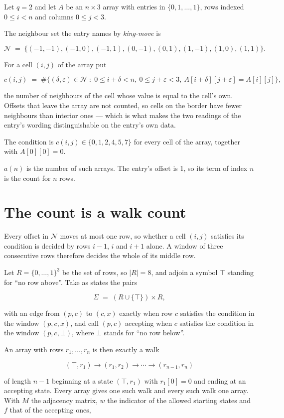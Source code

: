 \documentclass[11pt]{article}
\theoremstyle{definition}
\begin{document}
Let $q = 2$ and let $A$ be an $n \times 3$ array with entries in $\{0,1,\dots,1\}$, rows indexed $0 \le i < n$ and columns $0 \le j < 3$.

The neighbour set the entry names by {\itshape king-move} is

\[\mathcal{N} \;=\; \{(-1,-1), (-1,0), (-1,1), (0,-1), (0,1), (1,-1), (1,0), (1,1)\}.\]

For a cell $(i,j)$ of the array put

\[c(i,j) \;=\; \#\bigl\{(\delta,\varepsilon)\in\mathcal{N} \;:\; 0\le i+\delta<n,\ 0\le j+\varepsilon<3,\ A[i+\delta][j+\varepsilon] = A[i][j]\bigr\},\]

the number of neighbours of the cell whose value is equal to the cell's own. Offsets that leave the array are not counted, so cells on the border have fewer neighbours than interior ones --- which is what makes the two readings of the entry's wording distinguishable on the entry's own data.

The condition is $c(i,j) \in \{0, 1, 2, 4, 5, 7\}$ for every cell of the array, together with $A[0][0]=0$.

$a(n)$ is the number of such arrays. The entry's offset is 1, so its term of index $n$ is the count for $n$ rows.

\section{The count is a walk count}

Every offset in $\mathcal{N}$ moves at most one row, so whether a cell $(i,j)$ satisfies its condition is decided by rows $i-1$, $i$ and $i+1$ alone. A window of three consecutive rows therefore decides the whole of its middle row.

Let $R = \{0,\dots,1\}^{3}$ be the set of rows, so $|R| = 8$, and adjoin a symbol $\top$ standing for ``no row above''. Take as states the pairs

\[\Sigma \;=\; (R \cup \{\top\}) \times R,\]

with an edge from $(p,c)$ to $(c,x)$ exactly when row $c$ satisfies the condition in the window $(p,c,x)$, and call $(p,c)$ accepting when $c$ satisfies the condition in the window $(p,c,\bot)$, where $\bot$ stands for ``no row below''.

An array with rows $r_1,\dots,r_n$ is then exactly a walk

\[(\top,r_1) \to (r_1,r_2) \to \cdots \to (r_{n-1},r_n)\]

of length $n-1$ beginning at a state $(\top,r_1)$ with $r_1[0]=0$ and ending at an accepting state. Every array gives one such walk and every such walk one array. With $M$ the adjacency matrix, $w$ the indicator of the allowed starting states and $f$ that of the accepting ones,
\end{document}
